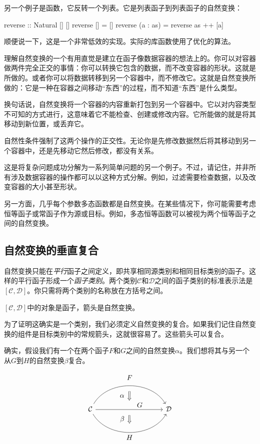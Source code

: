 \documentclass[DaoFP]{subfiles}
\begin{document}
另一个例子是函数，它反转一个列表。它是列表函子到列表函子的自然变换：
\begin{haskell}
reverse :: Natural [] []
reverse [] = []
reverse (a : as) = reverse as ++ [a]
\end{haskell}
顺便说一下，这是一个非常低效的实现。实际的库函数使用了优化的算法。

理解自然变换的一个有用直觉是建立在函子像数据容器的想法上的。你可以对容器做两件完全正交的事情：你可以转换它包含的数据，而不改变容器的形状。这就是所做的。或者你可以将数据转移到另一个容器中，而不修改它。这就是自然变换所做的：它是一种在容器之间移动“东西”的过程，而不知道“东西”是什么类型。

换句话说，自然变换将一个容器的内容重新打包到另一个容器中。它以对内容类型不可知的方式进行，这意味着它不能检查、创建或修改内容。它所能做的就是将其移动到新位置，或丢弃它。

自然性条件强制了这两个操作的正交性。无论你是先修改数据然后将其移动到另一个容器中，还是先移动它然后修改，都没有关系。

这是将复杂问题成功分解为一系列简单问题的另一个例子。不过，请记住，并非所有涉及数据容器的操作都可以以这种方式分解。例如，过滤需要检查数据，以及改变容器的大小甚至形状。

另一方面，几乎每个参数多态函数都是自然变换。在某些情况下，你可能需要考虑恒等函子或常函子作为源或目标。例如，多态恒等函数可以被视为两个恒等函子之间的自然变换。

\subsection{自然变换的垂直复合}

自然变换只能在\emph{平行}函子之间定义，即共享相同源类别和相同目标类别的函子。这样的平行函子形成一个\emph{函子类别}。两个类别$\mathcal{C}$和$\mathcal{D}$之间的函子类别的标准表示法是$[\mathcal{C}, \mathcal{D}]$。你只需将两个类别的名称放在方括号之间。

$[\mathcal{C}, \mathcal{D}]$中的对象是函子，箭头是自然变换。

为了证明这确实是一个类别，我们必须定义自然变换的复合。如果我们记住自然变换的组件是目标类别中的常规箭头，这就很容易了。这些箭头可以复合。

确实，假设我们有一个在两个函子$F$和$G$之间的自然变换$\alpha$。我们想将其与另一个从$G$到$H$的自然变换$\beta$复合。

\[
\begin{tikzcd}[column sep=huge]
\mathcal{C}
  \arrow[bend left=60]{rr}[name=U, label=above:$F$]{}
  \arrow[]{rr}[name=M, label={[xshift=15pt, yshift=-5pt]:$G$}]{} 
  \arrow[bend right=60]{rr}[name=D, label=below:$H$]{} 
 &&
\mathcal{D}
  \arrow[shorten <=8pt, shorten >=8pt,Rightarrow, to path={(U) -- node[label=left:$\alpha$] {} (M)}]{}
  \arrow[shorten <=8pt, shorten >=8pt,Rightarrow, to path={(M) -- node[label=left:$\beta$] {} (D)}]{}
\end{tikzcd}
\]
\end{document}
